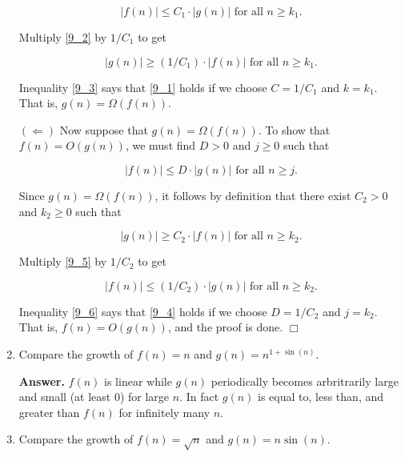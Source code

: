 \documentclass[9pt]{article}
\newcommand{\qed}{\hfill \ensuremath{\Box}}
\begin{document}
\begin{enumerate}
      \begin{equation} \label{9_2}
         |f(n)| \le C_1 \cdot |g(n)| \text{ for all } n \ge k_1.
      \end{equation}

      Multiply \eqref{9_2} by $1/C_1$ to get

      \begin{equation} \label{9_3}
         |g(n)| \ge (1/C_1) \cdot |f(n)| \text{ for all } n \ge k_1.
      \end{equation}

      Inequality \eqref{9_3} says that \eqref{9_1} holds if we choose
      $C = 1/C_1$ and $k = k_1$. That is, $g(n) = \Omega(f(n))$.

      $(\Leftarrow)$ Now suppose that $g(n) = \Omega(f(n))$. To show that
      $f(n) = O(g(n))$, we must find $D > 0$ and $j \ge 0$ such that

      \begin{equation} \label{9_4}
         |f(n)| \le D \cdot |g(n)| \text{ for all } n \ge j.
      \end{equation}

      Since $g(n) = \Omega(f(n))$, it follows by definition that there exist
      $C_2 > 0$ and $k_2 \ge 0$ such that 

      \begin{equation} \label{9_5}
         |g(n)| \ge C_2 \cdot |f(n)| \text{ for all } n \ge k_2.
      \end{equation}

      Multiply \eqref{9_5} by $1/C_2$ to get

      \begin{equation} \label{9_6}
         |f(n)| \le (1/C_2) \cdot |g(n)| \text{ for all } n \ge k_2.
      \end{equation}

      Inequality \eqref{9_6} says that \eqref{9_4} holds if we choose
      $D = 1/C_2$ and $j = k_2$. That is, $f(n) = O(g(n))$, and the proof is
      done. \qed
   \item Compare the growth of $f(n) = n$ and $g(n) = n^{1+\sin(n)}$.

      \textbf{Answer.} $f(n)$ is linear while $g(n)$ periodically becomes
      arbritrarily large and small (at least 0) for large $n$. In fact $g(n)$ is
      equal to, less than, and greater than $f(n)$ for infinitely many $n$.
   \item Compare the growth of $f(n) = \sqrt{n}$ and $g(n) = n\sin(n)$.


\end{enumerate}
\end{document}
